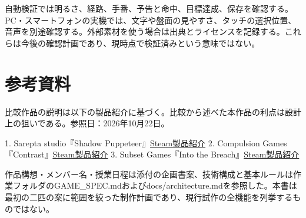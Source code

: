 \documentclass[a4paper,11pt,dvipdfmx]{jsarticle}
\begin{document}
自動検証では明るさ、経路、手番、予告と命中、目標達成、保存を確認する。PC・スマートフォンの実機では、文字や盤面の見やすさ、タッチの選択位置、音声を別途確認する。外部素材を使う場合は出典とライセンスを記録する。これらは今後の確認計画であり、現時点で検証済みという意味ではない。

\section*{参考資料}

比較作品の説明は以下の製品紹介に基づく。比較から述べた本作品の利点は設計上の狙いである。参照日：2026年10月22日。

1. Sarepta studio『Shadow Puppeteer』\href{https://store.steampowered.com/app/316480/Shadow_Puppeteer/}{Steam製品紹介}
2. Compulsion Games『Contrast』\href{https://store.steampowered.com/app/224460/Contrast/}{Steam製品紹介}
3. Subset Games『Into the Breach』\href{https://store.steampowered.com/app/590380/Into_the_Breach/}{Steam製品紹介}

作品構想・メンバー名・授業日程は添付の企画書案、技術構成と基本ルールは作業フォルダのGAME\_SPEC.mdおよびdocs/architecture.mdを参照した。本書は最初の二匹の案に範囲を絞った制作計画であり、現行試作の全機能を列挙するものではない。
\end{document}
